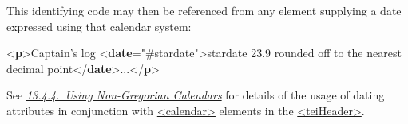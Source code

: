 This identifying code may then be referenced from any element supplying a date expressed using that calendar system: \par\bgroup{}\exampleFont \begin{shaded}\noindent\mbox{}{<\textbf{p}>}Captain's log {<\textbf{date}\hspace*{1em}{calendar}="{\#stardate}">}stardate 23.9 rounded off\mbox{}\newline 
\hspace*{1em}\hspace*{1em} to the nearest decimal point{</\textbf{date}>}...{</\textbf{p}>}\end{shaded}\egroup\par \noindent  See \textit{\hyperref[NDDATECUSTOM]{13.4.4.\ Using Non-Gregorian Calendars}} for details of the usage of dating attributes in conjunction with \hyperref[TEI.calendar]{<calendar>} elements in the \hyperref[TEI.teiHeader]{<teiHeader>}.
